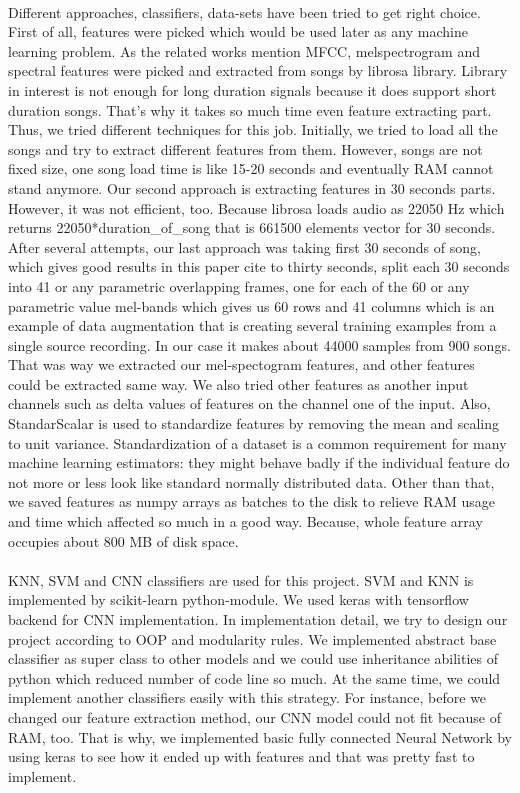 \documentclass[10pt,twocolumn,letterpaper]{article}
\begin{document}
  \paragraph{}Different approaches, classifiers, data-sets have been tried to get right choice. First of all, features were picked which would be used later as any machine learning problem. As the related works mention MFCC, melspectrogram and spectral features were picked and extracted from songs by librosa library. Library in interest is not enough for long duration signals because it does support short duration songs. That's why it takes so much time even feature extracting part. Thus, we tried different techniques for this job. Initially, we tried to load all the songs and try to extract different features from them. However, songs are not fixed size, one song load time is like 15-20 seconds and eventually RAM cannot stand anymore. Our second approach is extracting features in 30 seconds parts. However, it was not efficient, too. Because librosa loads audio as 22050 Hz which returns 22050*duration\_of\_song that is 661500 elements vector for 30 seconds. After several attempts, our last approach was taking first 30 seconds of song, which gives good results in this paper cite to thirty seconds, split each 30 seconds into 41 or any parametric overlapping frames, one for each of the 60 or any parametric value mel-bands which gives us 60 rows and 41 columns which is an example of data augmentation that is creating several training examples from a single source recording. In our case it makes about 44000 samples from 900 songs. That was way we extracted our mel-spectogram features, and other features could be extracted same way. We also tried other features as another input channels such as delta values of features on the channel one of the input. Also, StandarScalar is used to standardize features by removing the mean and scaling to unit variance. Standardization of a dataset is a common requirement for many machine learning estimators: they might behave badly if the individual feature do not more or less look like standard normally distributed data. Other than that, we saved features as numpy arrays as batches to the disk to relieve RAM usage and time which affected so much in a good way. Because, whole feature array occupies about 800 MB of disk space.
  
  \paragraph{}KNN, SVM and CNN classifiers are used for this project. SVM and KNN is implemented by scikit-learn python-module. We used keras with tensorflow backend for CNN implementation. In implementation detail, we try to design our project according to OOP and modularity rules. We implemented abstract base classifier as super class to other models and we could use inheritance abilities of python which reduced number of code line so much. At the same time, we could implement another classifiers easily with this strategy. For instance, before we changed our feature extraction method, our CNN model could not fit because of RAM, too. That is why, we implemented basic fully connected Neural Network by using keras to see how it ended up with features and that was pretty fast to implement. 
  
\end{document}
